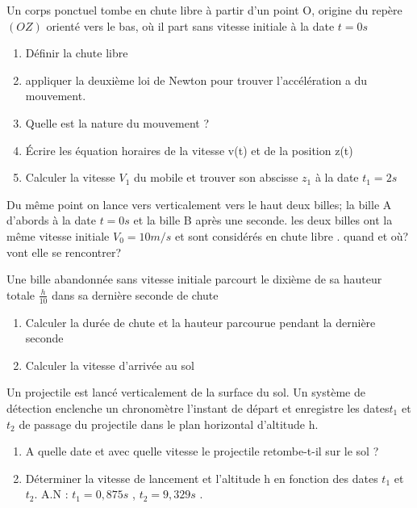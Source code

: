 \documentclass[10pt,a4paper]{article}
\begin{document}
\begin{tcolorbox}[sabour,title=EXERCICE 10]

Un corps ponctuel tombe en chute libre à partir d'un point O, origine du repère $(OZ)$ orienté vers le bas, où il part sans vitesse initiale à la date $t=0s$ 
\begin{enumerate}
\item Définir la chute libre 
\item appliquer la deuxième loi de Newton pour trouver l'accélération a du mouvement. 
\item Quelle est la nature du mouvement ? 
\item Écrire les équation horaires de la vitesse v(t) et de la position z(t)
\item Calculer la vitesse $V_1$ du mobile et trouver son abscisse $z_1$ à la date $t_1=2 s$
\end{enumerate}

\end{tcolorbox}
\begin{tcolorbox}[sabour,title=EXERCICE 11]
Du même point on lance vers  verticalement vers le haut deux billes;  la bille A d'abords à la date $t=0s$ et la bille B après une seconde. les deux billes ont la même vitesse initiale $V_0=10m/s$ et sont considérés en chute libre  . quand et où? vont elle se rencontrer?

\end{tcolorbox}


\begin{tcolorbox}[sabour,title=EXERCICE 12]
Une bille abandonnée sans vitesse initiale parcourt le dixième de sa hauteur totale $\frac{h}{10} $  dans sa dernière seconde de chute 
\begin{enumerate}
\item Calculer la durée de chute et la hauteur parcourue pendant la dernière seconde 
\item Calculer la vitesse d'arrivée au sol 
\end{enumerate}
\end{tcolorbox}

\begin{tcolorbox}[sabour,title=EXERCICE 13]
Un projectile est lancé verticalement de la surface du sol. Un système de détection enclenche un chronomètre  l'instant de départ et enregistre les dates$ t_1$ et $t_2$  de passage du projectile dans le plan horizontal d'altitude h.
\begin{enumerate}

\item  A quelle date et avec quelle vitesse le projectile retombe-t-il sur le sol ? 
\item Déterminer la vitesse de lancement et l'altitude h en fonction des dates $t_1$ et $t_2$. 
A.N : $t_1 = 0,875s$ , $ t_2 = 9,329s$ .

\end{enumerate}
\end{tcolorbox}
\end{document}

